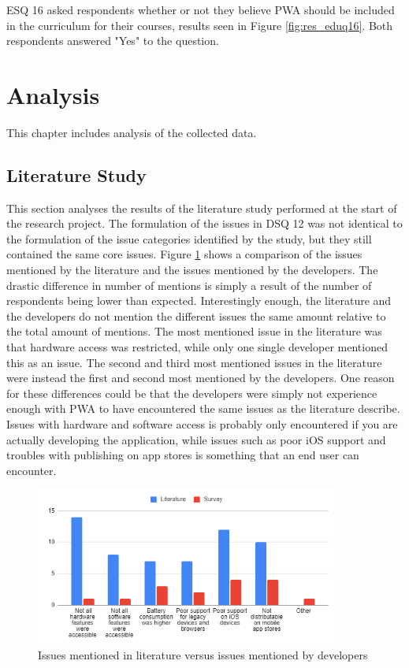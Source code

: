 \documentclass[a4paper,12pt]{article}
\renewcommand{\arraystretch}{1.5}
\begin{document}
ESQ 16 asked respondents whether or not they believe PWA should be included in the curriculum for their courses, results seen in Figure \ref{fig:res_eduq16}. Both respondents answered "Yes" to the question.

\setlength{\arrayrulewidth}{0.5mm}
\setlength{\tabcolsep}{8pt}
\renewcommand{\arraystretch}{1.5}
\newpage

\section{Analysis}
\label{Analysis}
This chapter includes analysis of the collected data.

\subsection{Literature Study}
\label{Analysis_study}
This section analyses the results of the literature study performed at the start of the research project. The formulation of the issues in DSQ 12 was not identical to the formulation of the issue categories identified by the study, but they still contained the same core issues. Figure \ref{fig:analysis_issues} shows a comparison of the issues mentioned by the literature and the issues mentioned by the developers. The drastic difference in number of mentions is simply a result of the number of respondents being lower than expected. Interestingly enough, the literature and the developers do not mention the different issues the same amount relative to the total amount of mentions. The most mentioned issue in the literature was that hardware access was restricted, while only one single developer mentioned this as an issue. The second and third most mentioned issues in the literature were instead the first and second most mentioned by the developers. One reason for these differences could be that the developers were simply not experience enough with PWA to have encountered the same issues as the literature describe. Issues with hardware and software access is probably only encountered if you are actually developing the application, while issues such as poor iOS support and troubles with publishing on app stores is something that an end user can encounter.

\begin{figure}[ht!]
    \centering
    \includegraphics[width=10cm]{img/Analysis/issues.png}
    \caption{Issues mentioned in literature versus issues mentioned by developers}
    \label{fig:analysis_issues}
\end{figure}
\end{document}
